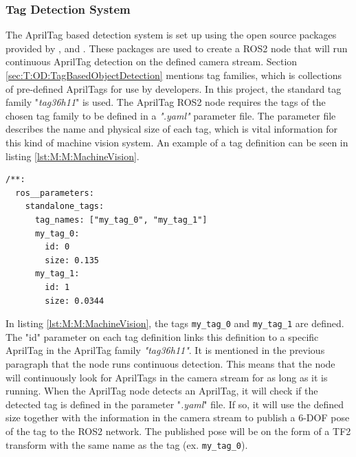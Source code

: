 \subsubsection{Tag Detection System} \label{sec:M:MRC:MV:TagDetectionSystem}
The AprilTag based detection system is set up using the open source packages provided by \cite{apriltag_repo}, \cite{apriltag_ros_repo} and \cite{apriltag_msgs_repo}. These packages are used to create a ROS2 node that will run continuous AprilTag detection on the defined camera stream. Section \ref{sec:T:OD:TagBasedObjectDetection} mentions tag families, which is collections of pre-defined AprilTags for use by developers. In this project, the standard tag family "\textit{tag36h11}" is used. The AprilTag ROS2 node requires the tags of the chosen tag family to be defined in a \textit{".yaml"} parameter file. The parameter file describes the name and physical size of each tag, which is vital information for this kind of machine vision system. An example of a tag definition can be seen in listing \ref{lst:M:M:MachineVision}.

\begin{lstlisting}[language=XML, label=lst:M:M:MachineVision, caption={Example of AprilTag tag definitions in a ".yaml" file. This example defines two tags of different names, using the tag id 0 and 1 in the defined tag family The size is alse defined for each tag. The tag family (tag36h11) is set in another parameter file.}]
/**:
  ros__parameters:
    standalone_tags:
      tag_names: ["my_tag_0", "my_tag_1"]
      my_tag_0:
        id: 0
        size: 0.135
      my_tag_1:
        id: 1
        size: 0.0344
\end{lstlisting}

In listing \ref{lst:M:M:MachineVision}, the tags \lstinline{my_tag_0} and \lstinline{my_tag_1} are defined. The "id" parameter on each tag definition links this definition to a specific AprilTag in the AprilTag family \textit{"tag36h11"}. It is mentioned in the previous paragraph that the node runs continuous detection. This means that the node will continuously look for AprilTags in the camera stream for as long as it is running. When the AprilTag node detects an AprilTag, it will check if the detected tag is defined in the parameter "\textit{.yaml}" file. If so, it will use the defined size together with the information in the camera stream to publish a 6-DOF pose of the tag to the ROS2 network. The published pose will be on the form of a TF2 transform with the same name as the tag (ex. \lstinline{my_tag_0}).

